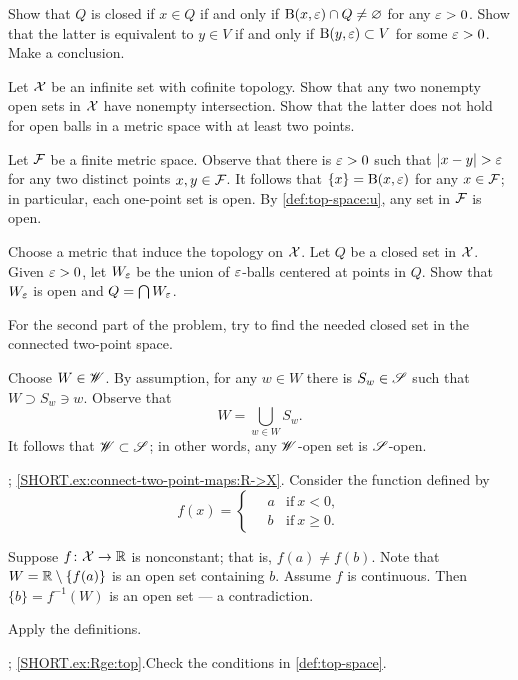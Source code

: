 \begin{multicols}{2}
Show that $Q$ is closed if $x\in Q$ if and only if $\mathrm{B}(x,\varepsilon)\cap Q\ne\varnothing$ for any $\varepsilon>0$.
Show that the latter is equivalent to $y\in V$ if and only if $\mathrm{B}(y,\varepsilon)\subset V$ for some $\varepsilon>0$.
Make a conclusion.

Let $\mathcal{X}$ be an infinite set with cofinite topology.
Show that any two nonempty open sets in $\mathcal{X}$ have nonempty intersection.
Show that the latter does not hold for open balls in a metric space with at least two points.


Let $\mathcal{F}$ be a finite metric space.
Observe that there is $\varepsilon>0$ such that $|x-y|>\eps$ for any two distinct points $x,y\in\mathcal{F}$.
It follows that $\{x\}=\mathrm{B}(x,\varepsilon)$ for any $x\in\mathcal{F}$;
in particular, each one-point set is open.
By \ref{def:top-space:u}, any set in $\mathcal{F}$ is open.

Choose a metric that induce the topology on $\mathcal{X}$.
Let $Q$ be a closed set in $\mathcal{X}$.
Given $\varepsilon>0$, let $W_\varepsilon$ be the union of $\varepsilon$-balls centered at points in $Q$.
Show that $W_\varepsilon$ is open and $Q=\bigcap W_\varepsilon$.

For the second part of the problem, try to find the needed closed set in the connected two-point space.

Choose $W\in \mathscr{W}$.
By assumption, for any $w\in W$ there is $S_w\in \mathscr{S}$ such that $W\supset S_w\ni w$.
Observe that 
\[W=\bigcup_{w\in W}S_w.\]
It follows that $\mathscr{W}\subset \mathscr{S}$;
in other words, any $\mathscr{W}$-open set is $\mathscr{S}$-open.

\parbf{\ref{ex:connect-two-point-maps}}; \ref{SHORT.ex:connect-two-point-maps:R->X}.
Consider the function defined by
\[
f(x)=
\begin{cases}
\quad a &\text{if}\ x< 0,
\\
\quad b &\text{if}\ x\ge 0.
\end{cases}
\]

 Suppose $f\colon\mathcal{X}\to \mathbb{R}$ is nonconstant;
that is, $f(a)\ne f(b)$.
Note that $W=\mathbb{R}\setminus\{f(a)\}$ is an open set containing $b$.
Assume $f$ is continuous.
Then $\{b\}=f^{-1}(W)$ is an open set --- a contradiction.

Apply the definitions.

\parbf{\ref{ex:Rge}}; \ref{SHORT.ex:Rge:top}.Check the conditions in \ref{def:top-space}.


\end{multicols}
